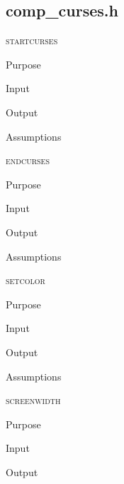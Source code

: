 \documentclass[pdftex, 11pt]{article}
\begin{document}
\subsection{comp\_curses.h}
\begin{description}

	\item{\textsc{startcurses}}
		\begin{description}
			\item{Purpose}


			\item{Input}


			\item{Output}


			\item{Assumptions}


		\end{description}


	\item{\textsc{endcurses}}
		\begin{description}
			\item{Purpose}


			\item{Input}


			\item{Output}


			\item{Assumptions}


		\end{description}


	\item{\textsc{setcolor}}
		\begin{description}
			\item{Purpose}


			\item{Input}


			\item{Output}


			\item{Assumptions}


		\end{description}


	\item{\textsc{screenwidth}}
		\begin{description}
			\item{Purpose}


			\item{Input}


			\item{Output}



\end{description}
\end{description}
\end{document}
